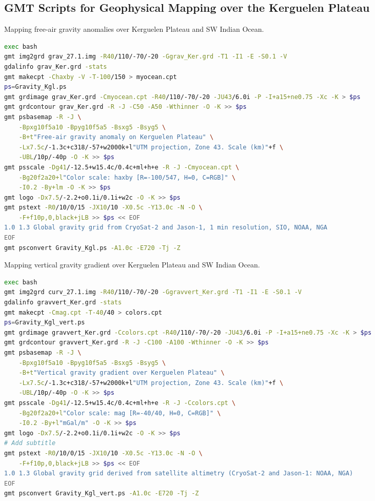 \documentclass[geomatics,article,accept,pdftex,moreauthors]{Definitions/mdpi}
\begin{document}
\subsection[\appendixname~\thesubsection]{GMT Scripts for Geophysical Mapping over the Kerguelen Plateau}
\vspace{-9pt}
\begin{listing}[H]
\caption{Mapping free-air gravity anomalies over Kerguelen Plateau and SW Indian Ocean.}
\label{lst07}
\begin{lstlisting}[xleftmargin=10pt,xrightmargin=3.5pt ,language=bash,caption={}]
exec bash
gmt img2grd grav_27.1.img -R40/110/-70/-20 -Ggrav_Ker.grd -T1 -I1 -E -S0.1 -V
gdalinfo grav_Ker.grd -stats
gmt makecpt -Chaxby -V -T-100/150 > myocean.cpt
ps=Gravity_Kgl.ps
gmt grdimage grav_Ker.grd -Cmyocean.cpt -R40/110/-70/-20 -JU43/6.0i -P -I+a15+ne0.75 -Xc -K > $ps
gmt grdcontour grav_Ker.grd -R -J -C50 -A50 -Wthinner -O -K >> $ps
gmt psbasemap -R -J \
    -Bpxg10f5a10 -Bpyg10f5a5 -Bsxg5 -Bsyg5 \
    -B+t"Free-air gravity anomaly on Kerguelen Plateau" \
    -Lx7.5c/-1.3c+c318/-57+w2000k+l"UTM projection, Zone 43. Scale (km)"+f \
    -UBL/10p/-40p -O -K >> $ps
gmt psscale -Dg41/-12.5+w15.4c/0.4c+ml+h+e -R -J -Cmyocean.cpt \
    -Bg20f2a20+l"Color scale: haxby [R=-100/547, H=0, C=RGB]" \
    -I0.2 -By+lm -O -K >> $ps
gmt logo -Dx7.5/-2.2+o0.1i/0.1i+w2c -O -K >> $ps
gmt pstext -R0/10/0/15 -JX10/10 -X0.5c -Y13.0c -N -O \
    -F+f10p,0,black+jLB >> $ps << EOF
1.0 1.3 Global gravity grid from CryoSat-2 and Jason-1, 1 min resolution, SIO, NOAA, NGA
EOF
gmt psconvert Gravity_Kgl.ps -A1.0c -E720 -Tj -Z
\end{lstlisting}
\end{listing}
\vspace{-18pt}
\begin{listing}[H]
\caption{Mapping vertical gravity gradient over Kerguelen Plateau and SW Indian Ocean.}
\label{lst08}
\begin{lstlisting}[xleftmargin=10pt,xrightmargin=3.5pt ,language=bash,caption={}]
exec bash
gmt img2grd curv_27.1.img -R40/110/-70/-20 -Ggravvert_Ker.grd -T1 -I1 -E -S0.1 -V
gdalinfo gravvert_Ker.grd -stats
gmt makecpt -Cmag.cpt -T-40/40 > colors.cpt
ps=Gravity_Kgl_vert.ps
gmt grdimage gravvert_Ker.grd -Ccolors.cpt -R40/110/-70/-20 -JU43/6.0i -P -I+a15+ne0.75 -Xc -K > $ps
gmt grdcontour gravvert_Ker.grd -R -J -C100 -A100 -Wthinner -O -K >> $ps
gmt psbasemap -R -J \
    -Bpxg10f5a10 -Bpyg10f5a5 -Bsxg5 -Bsyg5 \
    -B+t"Vertical gravity gradient over Kerguelen Plateau" \
    -Lx7.5c/-1.3c+c318/-57+w2000k+l"UTM projection, Zone 43. Scale (km)"+f \
    -UBL/10p/-40p -O -K >> $ps
gmt psscale -Dg41/-12.5+w15.4c/0.4c+ml+h+e -R -J -Ccolors.cpt \
    -Bg20f2a20+l"Color scale: mag [R=-40/40, H=0, C=RGB]" \
    -I0.2 -By+l"mGal/m" -O -K >> $ps
gmt logo -Dx7.5/-2.2+o0.1i/0.1i+w2c -O -K >> $ps
# Add subtitle
gmt pstext -R0/10/0/15 -JX10/10 -X0.5c -Y13.0c -N -O \
    -F+f10p,0,black+jLB >> $ps << EOF
1.0 1.3 Global gravity grid derived from satellite altimetry (CryoSat-2 and Jason-1: NOAA, NGA)
EOF
gmt psconvert Gravity_Kgl_vert.ps -A1.0c -E720 -Tj -Z
\end{lstlisting}
\end{listing}
\end{document}
